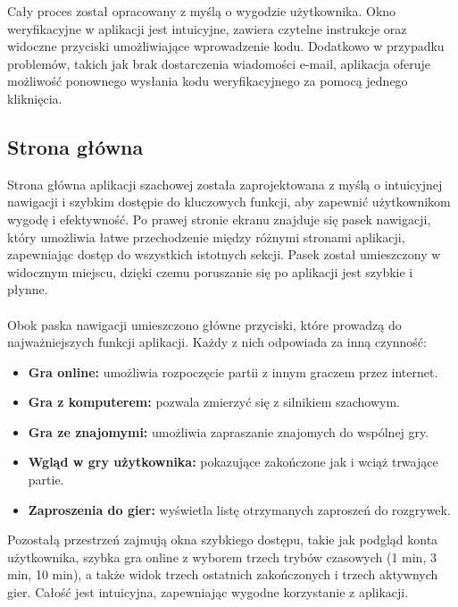 \documentclass[12pt,a4paper]{article}
\begin{document}
\noindent
Cały proces został opracowany z myślą o wygodzie użytkownika. Okno weryfikacyjne w aplikacji jest intuicyjne, zawiera czytelne instrukcje oraz widoczne przyciski umożliwiające wprowadzenie kodu. Dodatkowo w przypadku problemów, takich jak brak dostarczenia wiadomości e-mail, aplikacja oferuje możliwość ponownego wysłania kodu weryfikacyjnego za pomocą jednego kliknięcia.

\newpage

\subsection{Strona główna}

\noindent
Strona główna aplikacji szachowej została zaprojektowana z myślą o intuicyjnej nawigacji i szybkim dostępie do kluczowych funkcji, aby zapewnić użytkownikom wygodę i efektywność. Po prawej stronie ekranu znajduje się pasek nawigacji, który umożliwia łatwe przechodzenie między różnymi stronami aplikacji, zapewniając dostęp do wszystkich istotnych sekcji. Pasek został umieszczony w widocznym miejscu, dzięki czemu poruszanie się po aplikacji jest szybkie i płynne.
\\\\
Obok paska nawigacji umieszczono główne przyciski, które prowadzą do najważniejszych funkcji aplikacji. Każdy z nich odpowiada za inną czynność:

\begin{itemize}
    \item \textbf{Gra online:} umożliwia rozpoczęcie partii z innym graczem przez internet.
    \item \textbf{Gra z komputerem:} pozwala zmierzyć się z silnikiem szachowym.
    \item \textbf{Gra ze znajomymi:} umożliwia zapraszanie znajomych do wspólnej gry.
    \item \textbf{Wgląd w gry użytkownika:} pokazujące zakończone jak i wciąż trwające partie.
    \item \textbf{Zaproszenia do gier:} wyświetla listę otrzymanych zaproszeń do rozgrywek.
\end{itemize}

\noindent
Pozostałą przestrzeń zajmują okna szybkiego dostępu, takie jak podgląd konta użytkownika, szybka gra online z wyborem trzech trybów czasowych (1 min, 3 min, 10 min), a także widok trzech ostatnich zakończonych i trzech aktywnych gier. Całość jest intuicyjna, zapewniając wygodne korzystanie z aplikacji.
\end{document}
